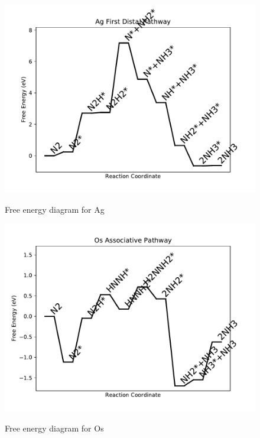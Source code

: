 \documentclass{article}
\begin{document}
\begin{figure}
\includegraphics[width=1\linewidth]{data/plots/Ag_distal_1.pdf}
\label{fig:Ag_distal_1}
\caption{Free energy diagram for Ag}
\end{figure}

\begin{figure}
\includegraphics[width=1\linewidth]{data/plots/Os_associative.pdf}
\label{fig:Os_associative}
\caption{Free energy diagram for Os}
\end{figure}
\end{document}
